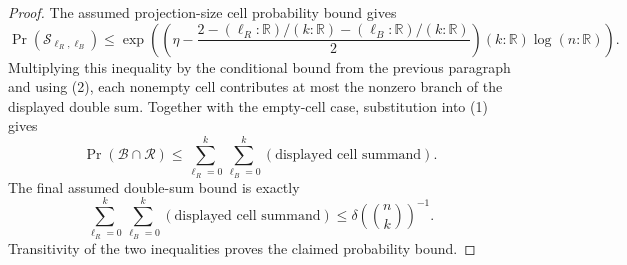 \begin{proof}
The assumed projection-size cell probability bound gives
\[
\Pr(\mathcal S_{\ell_R,\ell_B})
\le
\exp\!\left(
\left(\eta-\frac{2-(\ell_R:\mathbb R)/(k:\mathbb R)
-(\ell_B:\mathbb R)/(k:\mathbb R)}{2}\right)(k:\mathbb R)\log(n:\mathbb R)
\right).
\]
Multiplying this inequality by the conditional bound from the previous
paragraph and using (2), each nonempty cell contributes at most the nonzero
branch of the displayed double sum.  Together with the empty-cell case,
substitution into (1) gives
\[
\Pr(\mathcal B\cap\mathcal R)
\le
\sum_{\ell_R=0}^{k}\sum_{\ell_B=0}^{k}(\text{displayed cell summand}).
\]
The final assumed double-sum bound is exactly
\[
\sum_{\ell_R=0}^{k}\sum_{\ell_B=0}^{k}(\text{displayed cell summand})
\le \delta(\binom nk)^{-1}.
\]
Transitivity of the two inequalities proves the claimed probability bound.
\end{proof}
